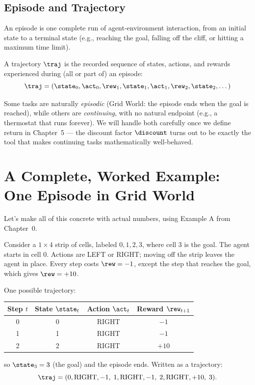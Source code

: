 \subsection*{Episode and Trajectory}
\begin{definition}[Episode]
An episode is one complete run of agent-environment interaction, from an
initial state to a terminal state (e.g., reaching the goal, falling off
the cliff, or hitting a maximum time limit).
\end{definition}

\begin{definition}[Trajectory]
A trajectory $\traj$ is the recorded sequence of states, actions, and
rewards experienced during (all or part of) an episode:
$$
\traj = (\state_0, \act_0, \rew_1, \state_1, \act_1, \rew_2, \state_2, \dots)
$$
\end{definition}

Some tasks are naturally \emph{episodic} (Grid World: the episode ends
when the goal is reached), while others are \emph{continuing}, with no
natural endpoint (e.g., a thermostat that runs forever). We will handle
both carefully once we define return in Chapter~5 — the discount factor
$\discount$ turns out to be exactly the tool that makes continuing tasks
mathematically well-behaved.

\section{A Complete, Worked Example: One Episode in Grid World}

Let's make all of this concrete with actual numbers, using Example A
from Chapter~0.

\begin{example}
Consider a $1 \times 4$ strip of cells, labeled $0, 1, 2, 3$, where cell
$3$ is the goal. The agent starts in cell $0$. Actions are LEFT or RIGHT;
moving off the strip leaves the agent in place. Every step costs
$\rew = -1$, except the step that reaches the goal, which gives
$\rew = +10$.

One possible trajectory:
\begin{center}
\begin{tabular}{@{}cccc@{}}
\toprule
Step $t$ & State $\state_t$ & Action $\act_t$ & Reward $\rew_{t+1}$ \\
\midrule
0 & 0 & RIGHT & $-1$ \\
1 & 1 & RIGHT & $-1$ \\
2 & 2 & RIGHT & $+10$ \\
\bottomrule
\end{tabular}
\end{center}
so $\state_3 = 3$ (the goal) and the episode ends. Written as a
trajectory:
$$
\traj = (0, \text{RIGHT}, -1,\; 1, \text{RIGHT}, -1,\; 2, \text{RIGHT}, +10,\; 3).
$$
\end{example}

